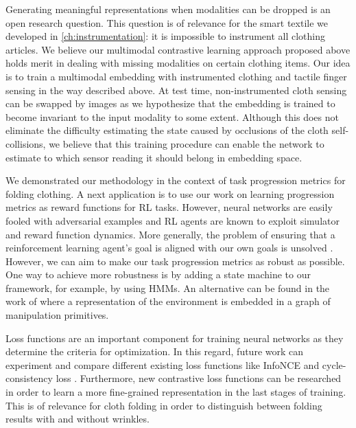 \documentclass[\home/main.tex]{subfiles}
\begin{document}
Generating meaningful representations when modalities can be dropped is an open research question. This question is of relevance for the smart textile we developed in \cref{ch:instrumentation}: it is impossible to instrument all clothing articles. We believe our multimodal contrastive learning approach proposed above holds merit in dealing with missing modalities on certain clothing items. Our idea is to train a multimodal embedding with instrumented clothing and tactile finger sensing in the way described above. At test time, non-instrumented cloth sensing can be swapped by images as we hypothesize that the embedding is trained to become invariant to the input modality to some extent. Although this does not eliminate the difficulty estimating the state caused by occlusions of the cloth self-collisions, we believe that this training procedure can enable the network to estimate to which sensor reading it should belong in embedding space.

We demonstrated our methodology in the context of task progression metrics for folding clothing. A next application is to use our work on learning progression metrics as reward functions for RL tasks. However, neural networks are easily fooled with adversarial examples \autocite{nguyen2015deep} and RL agents are known to exploit simulator and reward function dynamics. More generally, the problem of ensuring that a reinforcement learning agent's goal is aligned with our own goals is unsolved \autocite{Sutton2018}. However, we can aim to make our task progression metrics as robust as possible. One way to achieve more robustness is by adding a state machine to our framework, for example, by using \glspl{HMM}. An alternative can be found in the work of \textcite{borràs2020encoding} where a representation of the environment is embedded in a graph of manipulation primitives.

Loss functions are an important component for training neural networks as they determine the criteria for optimization. In this regard, future work can experiment and compare different existing loss functions like InfoNCE \autocite{oord2018representation} and cycle-consistency loss \autocite{Dwibedi2019cycle}.
Furthermore, new contrastive loss functions can be researched in order to learn a more fine-grained representation in the last stages of training. This is of relevance for cloth folding in order to distinguish between folding results with and without wrinkles.
\end{document}
